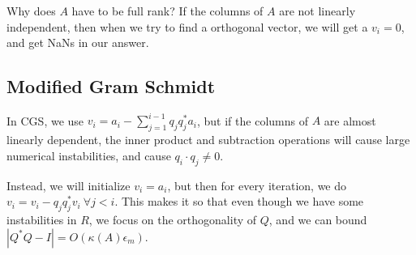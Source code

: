 \documentclass{article}
\theoremstyle{definition}
\begin{document}
Why does $A$ have to be full rank? If the columns of $A$ are not linearly independent, then when we try to find a orthogonal vector, we will get a $v_i = 0$, and get NaNs in our answer.

\subsection{Modified Gram Schmidt}

In CGS, we use $v_i = a_i - \sum_{j=1}^{i-1} q_j q_j^* a_i$, but if the columns of $A$ are almost linearly dependent, the inner product and subtraction operations will cause large numerical instabilities, and cause $q_i \cdot q_j \neq 0$. 

Instead, we will initialize $v_i = a_i$, but then for every iteration, we do $v_i = v_i - q_j q_j^* v_i\ \forall j < i$. This makes it so that even though we have some instabilities in $R$, we focus on the orthogonality of $Q$, and we can bound $|Q^* Q - I| = O(\kappa(A) \epsilon_m)$.
\end{document}
